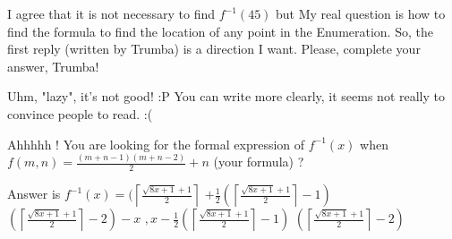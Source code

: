 \begin{solution}
	I agree that it is not necessary to find $f^{-1}(45)$ but My real question is how to find the formula to find the location of any point in the Enumeration. So, the first reply (written by Trumba) is a direction I want. Please, complete your answer, Trumba!
\end{solution}






\begin{solution}
	Uhm, "lazy", it's not good! :P
 You can write more clearly, it seems not really to convince people to read.
 :(
\end{solution}



\begin{solution}
	Ahhhhh ! You are looking for the formal expression of $f^{-1}(x)$ when $f(m,n)=\frac{(m+n-1)(m+n-2)}2+n$ (your formula) ?

Answer is $f^{-1}(x)=( \left\lceil\frac{\sqrt{8x+1}+1}2\right\rceil$ $+\frac 12(\left\lceil\frac{\sqrt{8x+1}+1}2\right\rceil-1)$ $(\left\lceil\frac{\sqrt{8x+1}+1}2\right\rceil-2)-x$ $,x-\frac 12(\left\lceil\frac{\sqrt{8x+1}+1}2\right\rceil-1)$ $(\left\lceil\frac{\sqrt{8x+1}+1}2\right\rceil-2)$
\end{solution}



